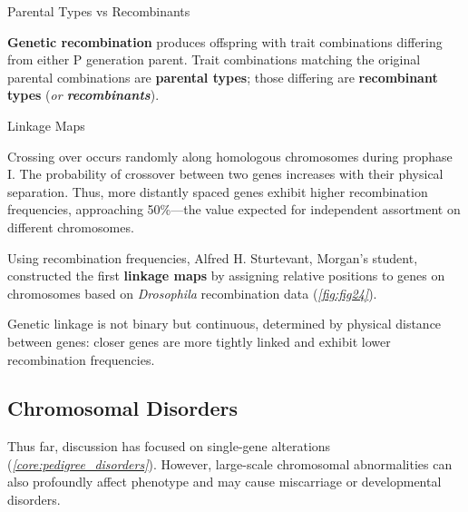 \documentclass[10pt]{article}
\begin{document}
    \begin{core}{Parental Types vs Recombinants}

      \textbf{Genetic recombination} produces offspring with trait combinations differing from either P generation parent. Trait combinations matching the original parental combinations are \textbf{parental types}; those differing are \textbf{recombinant types} (\textit{or \textbf{recombinants}}).

    \end{core}

    \begin{core}{Linkage Maps}

      Crossing over occurs randomly along homologous chromosomes during prophase I. The probability of crossover between two genes increases with their physical separation. Thus, more distantly spaced genes exhibit higher recombination frequencies, approaching 50\%---the value expected for independent assortment on different chromosomes.

      Using recombination frequencies, Alfred H. Sturtevant, Morgan's student, constructed the first \textbf{linkage maps} by assigning relative positions to genes on chromosomes based on \textit{Drosophila} recombination data (\textit{\autoref{fig:fig24}}).

      Genetic linkage is not binary but continuous, determined by physical distance between genes: closer genes are more tightly linked and exhibit lower recombination frequencies.


    \end{core}
  
  \subsection{Chromosomal Disorders}

    Thus far, discussion has focused on single-gene alterations (\textit{\autoref{core:pedigree_disorders}}). However, large-scale chromosomal abnormalities can also profoundly affect phenotype and may cause miscarriage or developmental disorders.
\end{document}
